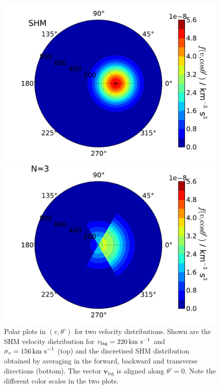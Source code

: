 \begin{figure}[t]
\label{fig:directional:fN3}
  \centering
  \includegraphics[width=1\textwidth]{Directional/SHMpolar.pdf}

  \includegraphics[width=1\textwidth]{Directional/SHMpolarN3.pdf}

\caption[Discretised velocity distribution for $N=3$ components]{Polar plots in $(v,\theta')$ for two velocity distributions. Shown are the SHM velocity distribution for $v_\textrm{lag} = 220 \,\textrm{km s}^{-1}$ and $\sigma_v = 156 \,\textrm{km s}^{-1}$ (top) and the discretised SHM distribution obtained by averaging in the forward, backward and transverse directions (bottom). The vector $\textbf{v}_\textrm{lag}$ is aligned along $\theta' = 0$. Note the different color scales in the two plots.}
\end{figure}

